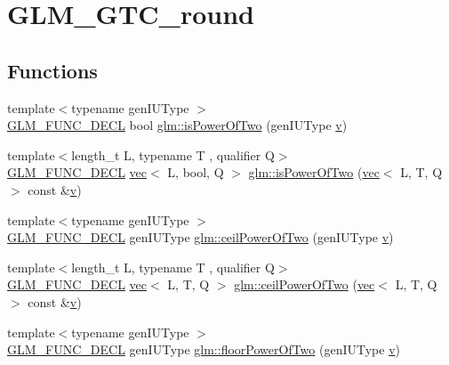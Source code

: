 \hypertarget{group__gtc__round}{}\section{G\+L\+M\+\_\+\+G\+T\+C\+\_\+round}
\label{group__gtc__round}
\subsection*{Functions}
\begin{DoxyCompactItemize}
\item 
{\footnotesize template$<$typename gen\+I\+U\+Type $>$ }\\\hyperlink{setup_8hpp_ab2d052de21a70539923e9bcbf6e83a51}{G\+L\+M\+\_\+\+F\+U\+N\+C\+\_\+\+D\+E\+CL} bool \hyperlink{group__gtc__round_gadf491730354aa7da67fbe23d4d688763}{glm\+::is\+Power\+Of\+Two} (gen\+I\+U\+Type \hyperlink{_s_d_l__opengl_8h_a10a82eabcb59d2fcd74acee063775f90}{v})
\item 
{\footnotesize template$<$length\+\_\+t L, typename T , qualifier Q$>$ }\\\hyperlink{setup_8hpp_ab2d052de21a70539923e9bcbf6e83a51}{G\+L\+M\+\_\+\+F\+U\+N\+C\+\_\+\+D\+E\+CL} \hyperlink{structglm_1_1vec}{vec}$<$ L, bool, Q $>$ \hyperlink{group__gtc__round_gabf2b61ded7049bcb13e25164f832a290}{glm\+::is\+Power\+Of\+Two} (\hyperlink{structglm_1_1vec}{vec}$<$ L, T, Q $>$ const \&\hyperlink{_s_d_l__opengl_8h_a10a82eabcb59d2fcd74acee063775f90}{v})
\item 
{\footnotesize template$<$typename gen\+I\+U\+Type $>$ }\\\hyperlink{setup_8hpp_ab2d052de21a70539923e9bcbf6e83a51}{G\+L\+M\+\_\+\+F\+U\+N\+C\+\_\+\+D\+E\+CL} gen\+I\+U\+Type \hyperlink{group__gtc__round_ga5c3ef36ae32aa4271f1544f92bd578b6}{glm\+::ceil\+Power\+Of\+Two} (gen\+I\+U\+Type \hyperlink{_s_d_l__opengl_8h_a10a82eabcb59d2fcd74acee063775f90}{v})
\item 
{\footnotesize template$<$length\+\_\+t L, typename T , qualifier Q$>$ }\\\hyperlink{setup_8hpp_ab2d052de21a70539923e9bcbf6e83a51}{G\+L\+M\+\_\+\+F\+U\+N\+C\+\_\+\+D\+E\+CL} \hyperlink{structglm_1_1vec}{vec}$<$ L, T, Q $>$ \hyperlink{group__gtc__round_gab53d4a97c0d3e297be5f693cdfdfe5d2}{glm\+::ceil\+Power\+Of\+Two} (\hyperlink{structglm_1_1vec}{vec}$<$ L, T, Q $>$ const \&\hyperlink{_s_d_l__opengl_8h_a10a82eabcb59d2fcd74acee063775f90}{v})
\item 
{\footnotesize template$<$typename gen\+I\+U\+Type $>$ }\\\hyperlink{setup_8hpp_ab2d052de21a70539923e9bcbf6e83a51}{G\+L\+M\+\_\+\+F\+U\+N\+C\+\_\+\+D\+E\+CL} gen\+I\+U\+Type \hyperlink{group__gtc__round_gafe273a57935d04c9db677bf67f9a71f4}{glm\+::floor\+Power\+Of\+Two} (gen\+I\+U\+Type \hyperlink{_s_d_l__opengl_8h_a10a82eabcb59d2fcd74acee063775f90}{v})

\end{DoxyCompactItemize}
